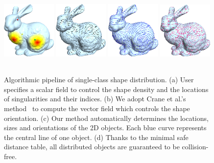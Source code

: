   \begin{figure}
  \centering
  \includegraphics[width=0.24\textwidth]{figs/asd/pipeline_singularity_density.png}
  \includegraphics[width=0.24\textwidth]{figs/asd/fig5_c_vector_field.png}
  \includegraphics[width=0.24\textwidth]{figs/asd/pipeline_curves40.png}
  \includegraphics[width=0.24\textwidth]{figs/asd/pipeline_flowerlong_40.png}\\
    \\
  \caption{Algorithmic pipeline of single-class shape distribution.
  (a) User specifies a scalar field to control the shape density and the locations of singularities and their indices.
  (b) We adopt Crane et al.'s method~\cite{crane2010trivial} to compute the vector field which controls the shape orientation.
  (c) Our method automatically determines the locations, sizes and orientations of the 2D objects.
  Each blue curve represents the central line of one object.
  (d) Thanks to the minimal safe distance table, all distributed objects are guaranteed to be collision-free.}
\label{fig:pipeline}
\end{figure}

